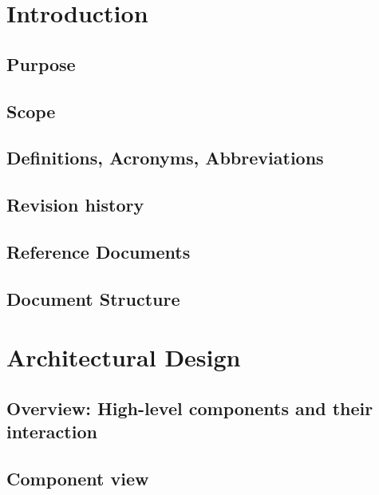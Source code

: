 \documentclass[a4paper]{article}
\begin{document}

\tableofcontents
{}


\section{Introduction}

\subsection{Purpose}

\subsection{Scope}

\subsection{Definitions, Acronyms, Abbreviations}

\subsection{Revision history}

\subsection{Reference Documents}

\subsection{Document Structure}

\section{Architectural Design}

\subsection{Overview: High-level components and their interaction}

\subsection{Component view}
\end{document}
